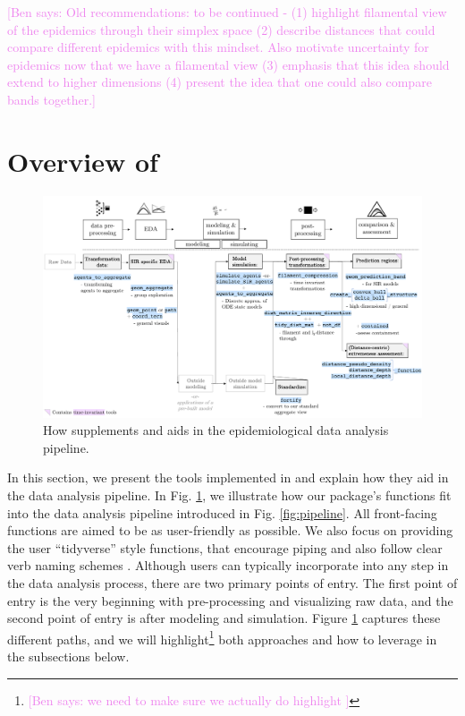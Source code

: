 \documentclass[
  shortnames]{jss}
\begin{document}
\textcolor{violet}{[Ben says: Old recommendations:
to be continued - (1) highlight filamental view of the epidemics through their simplex space (2) describe distances that could compare different epidemics with this mindset. Also motivate uncertainty for epidemics now that we have a filamental view (3) emphasis that this idea should extend to higher dimensions (4) present the idea that one could also compare bands together.]}

\section[Package overview]{Overview of
}\label{sec:overview}

\afterpage{\clearpage}
\begin{figure}
    \centering
    \includegraphics[width = 1\textwidth]{images/pipeline2_1.pdf}
    \caption{How  supplements and aids in the epidemiological data analysis pipeline.}
    \label{fig:pipeline2}
\end{figure}

In this section, we present the tools implemented in 
and explain how they aid in the data analysis pipeline. In Fig.
\ref{fig:pipeline2}, we illustrate how our package's functions fit into
the data analysis pipeline introduced in Fig. \ref{fig:pipeline}. All
front-facing functions are aimed to be as user-friendly as possible. We
also focus on providing the user ``tidyverse'' style functions, that
encourage piping and also follow clear verb naming schemes
\citep{Wickham2019}. Although users can typically incorporate
 into any step in the data analysis process, there are
two primary points of entry. The first point of entry is the very
beginning with pre-processing and visualizing raw data, and the second
point of entry is after modeling and simulation. Figure
\ref{fig:pipeline2} captures these different paths, and we will
highlight\footnote{\textcolor{violet}{[Ben says: we need to make sure we actually do highlight ]}}
both approaches and how to leverage  in the subsections
below.
\end{document}
